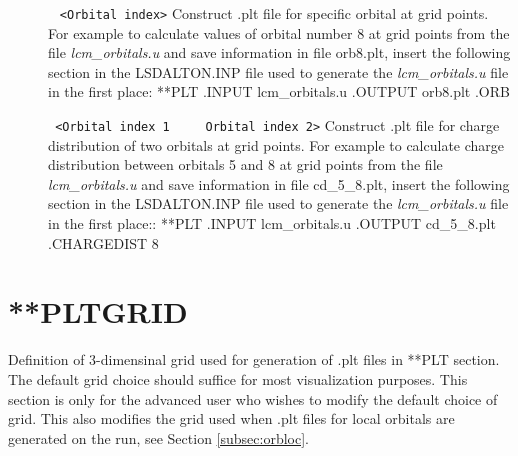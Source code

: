 \begin{description}
\item[]\verb| | \newline
\verb|<Orbital index>|\newline
Construct .plt file for specific orbital at grid points. For example to calculate values of orbital number 8 at grid points from the file  \emph{lcm\_orbitals.u} and save information in file orb8.plt, insert the following section in the LSDALTON.INP file used to generate the  \emph{lcm\_orbitals.u} file in the first place: \newline
**PLT \newline
.INPUT \newline
lcm\_orbitals.u \newline
.OUTPUT \newline
orb8.plt \newline
.ORB 

\item[]\verb| | \newline
\verb|<Orbital index 1     Orbital index 2>|\newline
Construct .plt file for charge distribution of two orbitals at grid points. 
For example to calculate charge distribution between orbitals 5 and 8 at grid points from the file  \emph{lcm\_orbitals.u} and save information in file cd\_5\_8.plt,
insert the following section in the LSDALTON.INP file used to generate the  \emph{lcm\_orbitals.u} file in the first place::
 \newline
**PLT \newline
.INPUT \newline
lcm\_orbitals.u \newline
.OUTPUT \newline
 cd\_5\_8.plt \newline
.CHARGEDIST   8

\end{description}



\section{**PLTGRID}\label{sec:pltgrid}
Definition of 3-dimensinal grid used for generation of .plt files in **PLT section.
The default grid choice should suffice for most visualization purposes. This section is only for the advanced user who wishes to modify the default choice of grid.
This also modifies the grid used when .plt files for local orbitals are generated on the run, see Section \ref{subsec:orbloc}.

